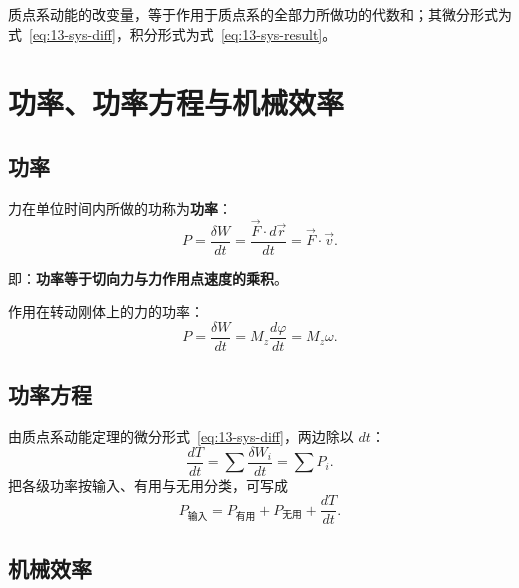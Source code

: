 \begin{theorem}[质点系的动能定理]
质点系动能的改变量，等于作用于质点系的全部力所做功的代数和；其微分形式为式~\eqref{eq:13-sys-diff}，积分形式为式~\eqref{eq:13-sys-result}。
\end{theorem}

\section{功率、功率方程与机械效率}

\subsection{功率}

\begin{definition}[功率]
力在单位时间内所做的功称为\textbf{功率}：
\begin{equation}\label{eq:13-power-def}
  P=\frac{\delta W}{dt}=\frac{\vec{F}\cdot d\vec{r}}{dt}=\vec{F}\cdot\vec{v}.
\end{equation}
\end{definition}

即：\textbf{功率等于切向力与力作用点速度的乘积}。

作用在转动刚体上的力的功率：
\begin{equation}\label{eq:13-power-rotor}
  P=\frac{\delta W}{dt}=M_z\frac{d\varphi}{dt}=M_z\omega .
\end{equation}

\subsection{功率方程}

由质点系动能定理的微分形式~\eqref{eq:13-sys-diff}，两边除以 $dt$：
\begin{equation}\label{eq:13-power-eq}
  \frac{dT}{dt}=\sum\frac{\delta W_i}{dt}=\sum P_i .
\end{equation}
把各级功率按输入、有用与无用分类，可写成
\begin{equation}\label{eq:13-power-balance}
  P_{\text{输入}}=P_{\text{有用}}+P_{\text{无用}}+\frac{dT}{dt}.
\end{equation}

\subsection{机械效率}

